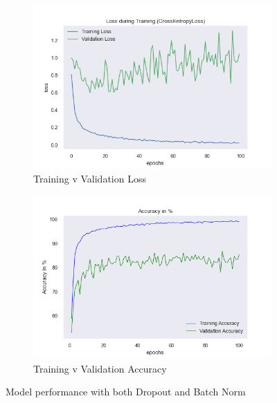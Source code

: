 \documentclass[a4paper]{article}
\begin{document}
\begin{figure}[H]
\centering
\begin{subfigure}{0.5\textwidth}
  \centering
  \includegraphics[width=1\linewidth]{img/baptiste/baptiste_100epoches_val_loss__Dropouts_True__BatchNorm_True.png}
  \caption{Training v Validation Loss}
  \label{fig:sub1}
\end{subfigure}%
\begin{subfigure}{0.5\textwidth}
  \centering
  \includegraphics[width=1\linewidth]{img/baptiste/baptiste_100epoches_train_accuracy__Dropouts_True__BatchNorm_True.png}
  \caption{Training v Validation Accuracy}
  \label{fig:sub2}
\end{subfigure}
\caption{Model performance with both Dropout and Batch Norm}
\label{fig:with-dropout-and-batchnorm}
\end{figure}
\end{document}
